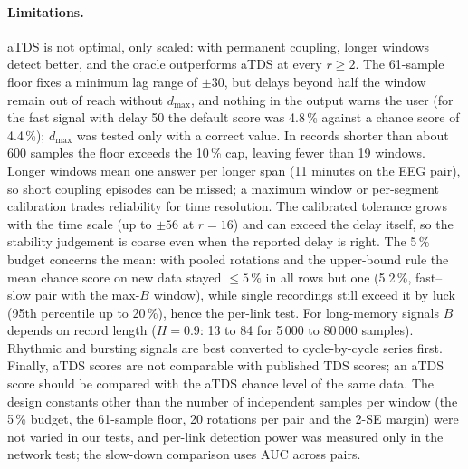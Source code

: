 \documentclass[11pt,a4paper]{article}
\begin{document}
\paragraph{Limitations.} aTDS is not optimal, only scaled: with permanent coupling, longer windows detect better, and the oracle outperforms aTDS at every $r \ge 2$. The 61-sample floor fixes a minimum lag range of $\pm30$, but delays beyond half the window remain out of reach without $d_{\max}$, and nothing in the output warns the user (for the fast signal with delay 50 the default score was 4.8\,\% against a chance score of 4.4\,\%); $d_{\max}$ was tested only with a correct value. In records shorter than about 600 samples the floor exceeds the 10\,\% cap, leaving fewer than 19 windows. Longer windows mean one answer per longer span (11 minutes on the EEG pair), so short coupling episodes can be missed; a maximum window or per-segment calibration trades reliability for time resolution. The calibrated tolerance grows with the time scale (up to $\pm56$ at $r = 16$) and can exceed the delay itself, so the stability judgement is coarse even when the reported delay is right. The 5\,\% budget concerns the mean: with pooled rotations and the upper-bound rule the mean chance score on new data stayed $\le 5\,\%$ in all rows but one (5.2\,\%, fast--slow pair with the max-$B$ window), while single recordings still exceed it by luck (95th percentile up to 20\,\%), hence the per-link test. For long-memory signals $B$ depends on record length ($H = 0.9$: 13 to 84 for 5\,000 to 80\,000 samples). Rhythmic and bursting signals are best converted to cycle-by-cycle series first. Finally, aTDS scores are not comparable with published TDS scores; an aTDS score should be compared with the aTDS chance level of the same data. The design constants other than the number of independent samples per window (the 5\,\% budget, the 61-sample floor, 20 rotations per pair and the 2-SE margin) were not varied in our tests, and per-link detection power was measured only in the network test; the slow-down comparison uses AUC across pairs.
\end{document}
